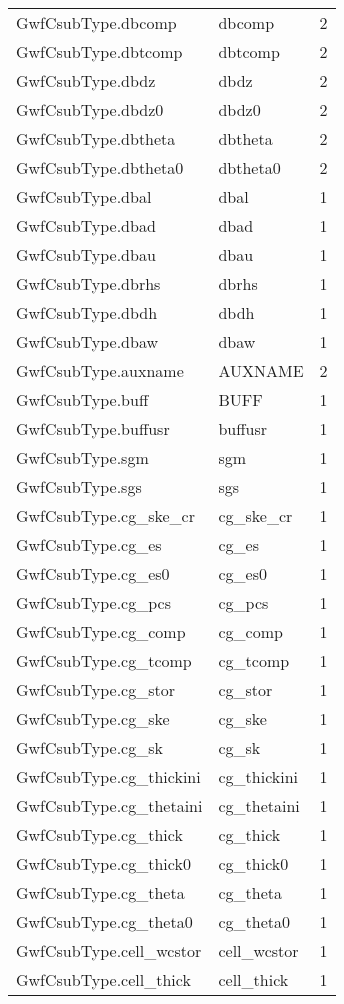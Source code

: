 \begin{longtable}{p{6cm} p{4cm} p{2cm} }
GwfCsubType.dbcomp & dbcomp & 2 \\ 
GwfCsubType.dbtcomp & dbtcomp & 2 \\ 
GwfCsubType.dbdz & dbdz & 2 \\ 
GwfCsubType.dbdz0 & dbdz0 & 2 \\ 
GwfCsubType.dbtheta & dbtheta & 2 \\ 
GwfCsubType.dbtheta0 & dbtheta0 & 2 \\ 
GwfCsubType.dbal & dbal & 1 \\ 
GwfCsubType.dbad & dbad & 1 \\ 
GwfCsubType.dbau & dbau & 1 \\ 
GwfCsubType.dbrhs & dbrhs & 1 \\ 
GwfCsubType.dbdh & dbdh & 1 \\ 
GwfCsubType.dbaw & dbaw & 1 \\ 
GwfCsubType.auxname & AUXNAME & 2 \\ 
GwfCsubType.buff &  BUFF & 1 \\ 
GwfCsubType.buffusr &  buffusr & 1 \\ 
GwfCsubType.sgm &  sgm & 1 \\ 
GwfCsubType.sgs &  sgs & 1 \\ 
GwfCsubType.cg\_ske\_cr &  cg\_ske\_cr & 1 \\ 
GwfCsubType.cg\_es &  cg\_es & 1 \\ 
GwfCsubType.cg\_es0 &  cg\_es0 & 1 \\ 
GwfCsubType.cg\_pcs &  cg\_pcs & 1 \\ 
GwfCsubType.cg\_comp &  cg\_comp & 1 \\ 
GwfCsubType.cg\_tcomp &  cg\_tcomp & 1 \\ 
GwfCsubType.cg\_stor &  cg\_stor & 1 \\ 
GwfCsubType.cg\_ske &  cg\_ske & 1 \\ 
GwfCsubType.cg\_sk &  cg\_sk & 1 \\ 
GwfCsubType.cg\_thickini &  cg\_thickini & 1 \\ 
GwfCsubType.cg\_thetaini &  cg\_thetaini & 1 \\ 
GwfCsubType.cg\_thick &  cg\_thick & 1 \\ 
GwfCsubType.cg\_thick0 &  cg\_thick0 & 1 \\ 
GwfCsubType.cg\_theta &  cg\_theta & 1 \\ 
GwfCsubType.cg\_theta0 &  cg\_theta0 & 1 \\ 
GwfCsubType.cell\_wcstor &  cell\_wcstor & 1 \\ 
GwfCsubType.cell\_thick &  cell\_thick & 1 \\ 

\end{longtable}

